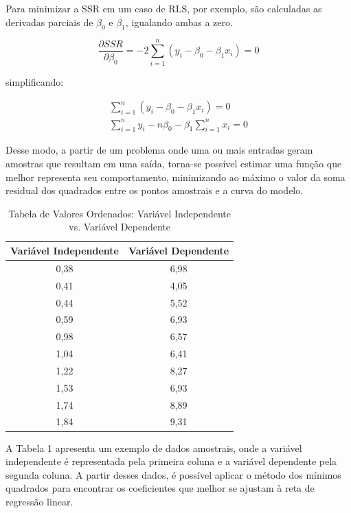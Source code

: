 Para minimizar a SSR em um caso de RLS, por exemplo, são calculadas as derivadas parciais de $\beta_0$ e $\beta_1$, igualando ambas a zero.

\begin{equation}
	\frac{\partial SSR}{\partial \beta_0} = -2 \sum_{i=1}^n (y_i - \beta_0 - \beta_1 x_i) = 0
\end{equation}

simplificando:

\begin{align*}
	\sum_{i=1}^n (y_i - \beta_0 - \beta_1 x_i) = 0 \\
	\sum_{i=1}^n y_i - n \beta_0 - \beta_1 \sum_{i=1}^n x_i = 0
\end{align*}


Desse modo, a partir de um problema onde uma ou mais entradas geram amostras que resultam em uma saída, torna-se possível estimar uma função que melhor representa seu comportamento, minimizando ao máximo o valor da soma residual dos quadrados entre os pontos amostrais e a curva do modelo. 

\begin{table}[h!]
\centering
\begin{tabular}{|c|c|}
\hline
\textbf{Variável Independente} & \textbf{Variável Dependente} \\
\hline
0,38 & 6,98 \\
0,41 & 4,05 \\
0,44 & 5,52 \\
0,59 & 6,93 \\
0,98 & 6,57 \\
1,04 & 6,41 \\
1,22 & 8,27 \\
1,53 & 6,93 \\
1,74 & 8,89 \\
1,84 & 9,31 \\
\hline
\end{tabular}
\caption{Tabela de Valores Ordenados: Variável Independente vs. Variável Dependente}
\end{table}

A Tabela 1 apresenta um exemplo de dados amostrais, onde a variável independente é representada pela primeira coluna e a variável dependente pela segunda coluna. A partir desses dados, é possível aplicar o método dos mínimos quadrados para encontrar os coeficientes que melhor se ajustam à reta de regressão linear.

